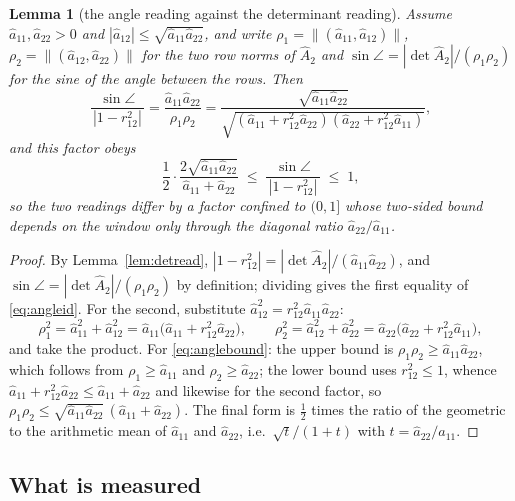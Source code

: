 \documentclass[11pt,a4paper]{article}
\theoremstyle{plain}
\newtheorem{lemma}[theorem]{Lemma}
\theoremstyle{definition}
\newcommand{\Ah}{\widehat{A}}
\newcommand{\ah}{\widehat{a}}
\begin{document}
\begin{lemma}[the angle reading against the determinant reading]
\label{lem:angle}
Assume $\ah_{11},\ah_{22}>0$ and $|\ah_{12}|\le\sqrt{\ah_{11}\ah_{22}}$, and
write $\rho_1=\lVert(\ah_{11},\ah_{12})\rVert$,
$\rho_2=\lVert(\ah_{12},\ah_{22})\rVert$ for the two row norms of $\Ah_2$ and
$\sin\angle=|\det\Ah_2|/(\rho_1\rho_2)$ for the sine of the angle between the
rows. Then
\begin{equation}
\label{eq:angleid}
  \frac{\sin\angle}{\,|1-r_{12}^{2}|\,}
  =\frac{\ah_{11}\ah_{22}}{\rho_1\rho_2}
  =\frac{\sqrt{\ah_{11}\ah_{22}}}
        {\sqrt{(\ah_{11}+r_{12}^{2}\ah_{22})(\ah_{22}+r_{12}^{2}\ah_{11})}},
\end{equation}
and this factor obeys
\begin{equation}
\label{eq:anglebound}
  \frac12\cdot\frac{2\sqrt{\ah_{11}\ah_{22}}}{\ah_{11}+\ah_{22}}
  \;\le\;\frac{\sin\angle}{\,|1-r_{12}^{2}|\,}\;\le\;1 ,
\end{equation}
so the two readings differ by a factor confined to $(0,1]$ whose two-sided
bound depends on the window only through the diagonal ratio
$\ah_{22}/\ah_{11}$.
\end{lemma}

\begin{proof}
By Lemma~\ref{lem:detread}, $|1-r_{12}^{2}|=|\det\Ah_2|/(\ah_{11}\ah_{22})$, and
$\sin\angle=|\det\Ah_2|/(\rho_1\rho_2)$ by definition; dividing gives the first
equality of \eqref{eq:angleid}. For the second, substitute
$\ah_{12}^{2}=r_{12}^{2}\ah_{11}\ah_{22}$:
\[
  \rho_1^{2}=\ah_{11}^{2}+\ah_{12}^{2}
  =\ah_{11}\bigl(\ah_{11}+r_{12}^{2}\ah_{22}\bigr),
  \qquad
  \rho_2^{2}=\ah_{12}^{2}+\ah_{22}^{2}
  =\ah_{22}\bigl(\ah_{22}+r_{12}^{2}\ah_{11}\bigr),
\]
and take the product. For \eqref{eq:anglebound}: the upper bound is
$\rho_1\rho_2\ge\ah_{11}\ah_{22}$, which follows from
$\rho_1\ge\ah_{11}$ and $\rho_2\ge\ah_{22}$; the lower bound uses
$r_{12}^{2}\le1$, whence $\ah_{11}+r_{12}^{2}\ah_{22}\le\ah_{11}+\ah_{22}$ and
likewise for the second factor, so
$\rho_1\rho_2\le\sqrt{\ah_{11}\ah_{22}}\,(\ah_{11}+\ah_{22})$. The final form is
$\tfrac12$ times the ratio of the geometric to the arithmetic mean of
$\ah_{11}$ and $\ah_{22}$, i.e.\ $\sqrt t/(1+t)$ with $t=\ah_{22}/\ah_{11}$.
\end{proof}

\subsection{What is measured}
\label{sec:measured}
\end{document}
